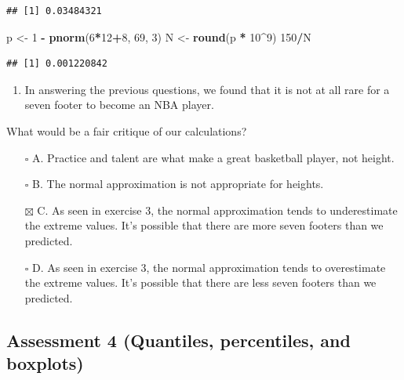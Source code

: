 \documentclass[
]{article}
\newenvironment{Shaded}{\begin{snugshade}}{\end{snugshade}}
\newcommand{\DecValTok}[1]{\textcolor[rgb]{0.00,0.00,0.81}{#1}}
\newcommand{\KeywordTok}[1]{\textcolor[rgb]{0.13,0.29,0.53}{\textbf{#1}}}
\newcommand{\NormalTok}[1]{#1}
\newcommand{\OperatorTok}[1]{\textcolor[rgb]{0.81,0.36,0.00}{\textbf{#1}}}
\newcommand{\StringTok}[1]{\textcolor[rgb]{0.31,0.60,0.02}{#1}}
\providecommand{\tightlist}{%
  \setlength{\itemsep}{0pt}\setlength{\parskip}{0pt}}
\begin{document}
\begin{verbatim}
## [1] 0.03484321
\end{verbatim}

\begin{Shaded}
\begin{Highlighting}[]
\NormalTok{p <-}\StringTok{ }\DecValTok{1} \OperatorTok{-}\StringTok{ }\KeywordTok{pnorm}\NormalTok{(}\DecValTok{6}\OperatorTok{*}\DecValTok{12}\OperatorTok{+}\DecValTok{8}\NormalTok{, }\DecValTok{69}\NormalTok{, }\DecValTok{3}\NormalTok{)}
\NormalTok{N <-}\StringTok{ }\KeywordTok{round}\NormalTok{(p }\OperatorTok{*}\StringTok{ }\DecValTok{10}\OperatorTok{^}\DecValTok{9}\NormalTok{)}
\DecValTok{150}\OperatorTok{/}\NormalTok{N}
\end{Highlighting}
\end{Shaded}

\begin{verbatim}
## [1] 0.001220842
\end{verbatim}

\begin{enumerate}
\def\labelenumi{\arabic{enumi}.}
\setcounter{enumi}{7}
\tightlist
\item
  In answering the previous questions, we found that it is not at all
  rare for a seven footer to become an NBA player.
\end{enumerate}

What would be a fair critique of our calculations?

\begin{itemize}
\tightlist
\item[$\square$]
  A. Practice and talent are what make a great basketball player, not
  height.
\item[$\square$]
  B. The normal approximation is not appropriate for heights.
\item[$\boxtimes$]
  C. As seen in exercise 3, the normal approximation tends to
  underestimate the extreme values. It's possible that there are more
  seven footers than we predicted.
\item[$\square$]
  D. As seen in exercise 3, the normal approximation tends to
  overestimate the extreme values. It's possible that there are less
  seven footers than we predicted.
\end{itemize}

\hypertarget{assessment-4-quantiles-percentiles-and-boxplots}{%
\subsection{Assessment 4 (Quantiles, percentiles, and
boxplots)}\label{assessment-4-quantiles-percentiles-and-boxplots}}
\end{document}
